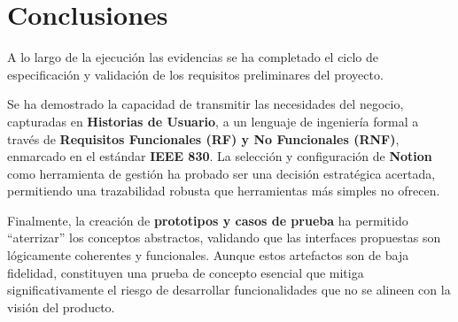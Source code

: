 \clearpage
\chapter*{Conclusiones}
{}

A lo largo de la ejecución las evidencias se ha completado el ciclo de especificación y validación de los requisitos preliminares del proyecto.

Se ha demostrado la capacidad de transmitir las necesidades del negocio, capturadas en \textbf{Historias de Usuario}, a un lenguaje de ingeniería formal a través de \textbf{Requisitos Funcionales (RF) y No Funcionales (RNF)}, enmarcado en el estándar \textbf{IEEE 830}. La selección y configuración de \textbf{Notion} como herramienta de gestión ha probado ser una decisión estratégica acertada, permitiendo una trazabilidad robusta que herramientas más simples no ofrecen.

Finalmente, la creación de \textbf{prototipos y casos de prueba} ha permitido ``aterrizar'' los conceptos abstractos, validando que las interfaces propuestas son lógicamente coherentes y funcionales. Aunque estos artefactos son de baja fidelidad, constituyen una prueba de concepto esencial que mitiga significativamente el riesgo de desarrollar funcionalidades que no se alineen con la visión del producto.
